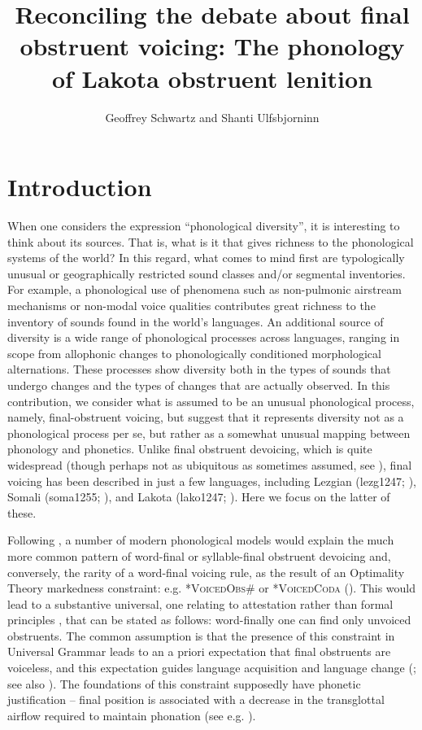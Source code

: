 \documentclass[output=paper]{langscibook}
\author{Geoffrey Schwartz\orcid{}\affiliation{Adam Mickiewicz University, Poznań} and {Shanti Ulfsbjorninn}\affiliation{Memorial University of Newfoundland}}
\title[Reconciling the debate about final obstruent voicing]{Reconciling the debate about final obstruent voicing: The phonology of Lakota obstruent lenition}
\begin{document}
\maketitle 

\section{Introduction}
\label{sec:schwartz:1}

When one considers the expression “phonological diversity”, it is interesting to think about its sources. That is, what is it that gives richness to the phonological systems of the world? In this regard, what comes to mind first are typologically unusual or geographically restricted sound classes and/or segmental inventories. For example, a phonological use of phenomena such as non-pulmonic airstream mechanisms or non-modal voice qualities contributes great richness to the inventory of sounds found in the world’s languages. An additional source of diversity is a wide range of phonological processes across languages, ranging in scope from allophonic changes to phonologically conditioned morphological alternations. These processes show diversity both in the types of sounds that undergo changes and the types of changes that are actually observed. In this contribution, we consider what is assumed to be an unusual phonological process, namely, final-obstruent voicing, but suggest that it represents diversity not as a phonological process per se, but rather as a somewhat unusual mapping between phonology and phonetics. Unlike final obstruent devoicing, which is quite widespread (though perhaps not as ubiquitous as sometimes assumed, see ), final voicing has been described in just a few languages, including Lezgian (lezg1247; \citealt{Yu2004}), Somali (soma1255; \citealt{Blevins2006}), and Lakota (lako1247; \citealt{Rood2016}). Here we focus on the latter of these.

Following \citet{Trubetzkoy1939}, a number of modern phonological models would explain the much more common pattern of word-final or syllable-final obstruent devoicing and, conversely, the rarity of a word-final voicing rule, as the result of an Optimality Theory markedness constraint: e.g. *\textsc{VoicedObs}\# or *\textsc{VoicedCoda}  (\citealt{WetzelsMascaro2001,Lombardi1999}). This would lead to a substantive universal, one relating to attestation rather than formal principles \citep{Hyman2008}, that can be stated as follows: word-finally one can find only unvoiced obstruents. The common assumption is that the presence of this constraint in Universal Grammar leads to an a priori expectation that final obstruents are voiceless, and this expectation guides language acquisition and language change (\citealt{Kiparsky2006,Kiparsky2008}; see also \citealt{Broselow2018}). The foundations of this constraint supposedly have phonetic justification – final position is associated with a decrease in the transglottal airflow required to maintain phonation (see e.g. \citealt{Ohala1997}).
\end{document}
